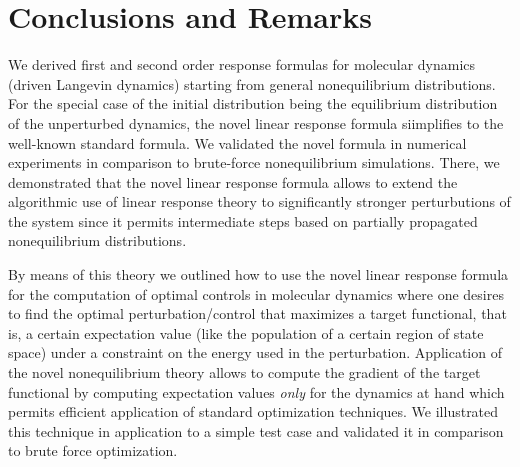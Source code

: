 \documentclass[]{tMPH2e}
\begin{document}
\section{Conclusions and Remarks}

We derived  first and second order response formulas for molecular dynamics (driven Langevin dynamics) starting from general nonequilibrium distributions. For the special case of the initial distribution being the equilibrium distribution of the unperturbed dynamics, the novel linear response formula siimplifies to the well-known standard formula. We validated the novel formula in numerical experiments in comparison to brute-force nonequilibrium simulations. There, we demonstrated that the novel linear response formula allows to extend the algorithmic use of linear response theory to significantly stronger perturbutions of the system since it permits intermediate steps based on partially propagated nonequilibrium distributions. 

By means of this theory we outlined how to use the novel linear response formula for the computation of optimal controls in molecular dynamics where one desires to find the optimal perturbation/control that maximizes a target functional, that is, a certain expectation value (like the population of a certain region of state space) under a constraint on the energy used in the perturbation. Application of the novel nonequilibrium theory allows to compute the gradient of the target functional by computing expectation values \emph{only} for the dynamics at hand which permits efficient application of standard optimization techniques. We illustrated this technique in application to a simple test case and validated it in comparison to brute force optimization.  













\end{document}
